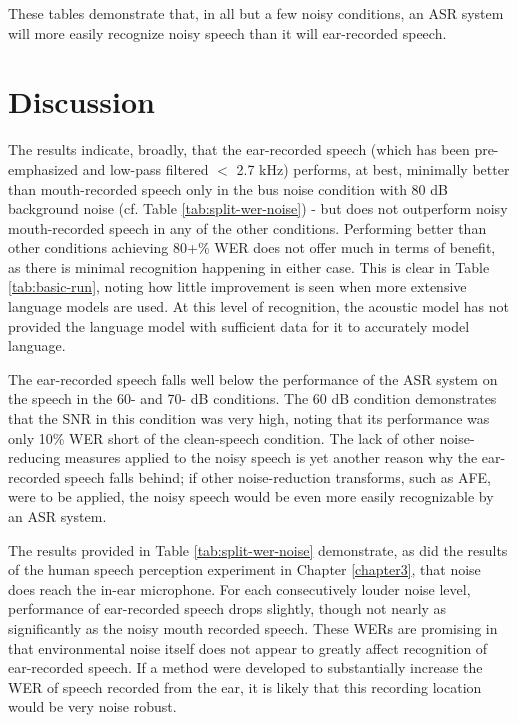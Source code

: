 These tables demonstrate that, in all but a few noisy conditions, an ASR system will more easily recognize noisy speech than it will ear-recorded speech.  




\section{Discussion}
\label{chap4:discussion}

The results indicate, broadly, that the ear-recorded speech (which has been pre-emphasized and low-pass filtered $<$ 2.7 kHz) performs, at best, minimally better than mouth-recorded speech only in the bus noise condition with 80 dB background noise (cf. Table \ref{tab:split-wer-noise}) - but does not outperform noisy mouth-recorded speech in any of the other conditions.  Performing better than other conditions achieving 80+\% WER does not offer much in terms of benefit, as there is minimal recognition happening in either case.  This is clear in Table \ref{tab:basic-run}, noting how little improvement is seen when more extensive language models are used.  At this level of recognition, the acoustic model has not provided the language model with sufficient data for it to accurately model language.

The ear-recorded speech falls well below the performance of the ASR system on the speech in the 60- and 70- dB conditions.  The 60 dB condition demonstrates that the SNR in this condition was very high, noting that its performance was only 10\% WER short of the clean-speech condition.  The lack of other noise-reducing measures applied to the noisy speech is yet another reason why the ear-recorded speech falls behind; if other noise-reduction transforms, such as AFE, were to be applied, the noisy speech would be even more easily recognizable by an ASR system.

The results provided in Table \ref{tab:split-wer-noise} demonstrate, as did the results of the human speech perception experiment in Chapter \ref{chapter3}, that noise does reach the in-ear microphone.  For each consecutively louder noise level, performance of ear-recorded speech drops slightly, though not nearly as significantly as the noisy mouth recorded speech.  These WERs are promising in that environmental noise itself does not appear to greatly affect recognition of ear-recorded speech.  If a method were developed to substantially increase the WER of speech recorded from the ear, it is likely that this recording location would be very noise robust.

